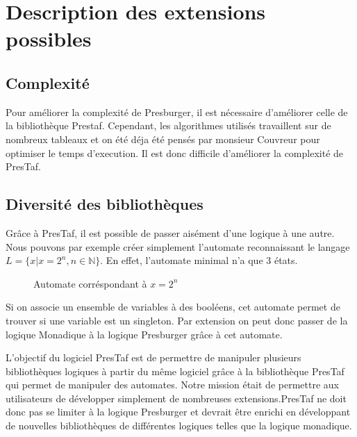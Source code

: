 \section{Description des extensions possibles}

\subsection{Complexité}

Pour améliorer la complexité de Presburger, il est nécessaire d'améliorer celle de la bibliothèque Prestaf. Cependant, les algorithmes utilisés travaillent sur de nombreux tableaux et on été déja été pensés par monsieur Couvreur pour optimiser le temps d'execution. Il est donc difficile d'améliorer la complexité de PresTaf.

\subsection{Diversité des bibliothèques}

Grâce à PresTaf, il est possible de passer aisément d'une logique à une autre. Nous pouvons par exemple créer simplement l'automate reconnaissant le langage $L = \{x | x = 2^n, n \in \mathbb{N} \}$. En effet, l'automate minimal n'a que 3 états.

\begin{figure}[h]

\centering

\caption{Automate corréspondant à $x = 2^n$}
\end{figure}

Si on associe un ensemble de variables à des booléens, cet automate permet de trouver si une variable est un singleton. Par extension on peut donc passer de la logique Monadique à la logique Presburger grâce à cet automate.\\\par

L'objectif du logiciel PresTaf est de permettre de manipuler plusieurs bibliothèques logiques à partir du même logiciel grâce à la bibliothèque PresTaf qui permet de manipuler des automates. Notre mission était de permettre aux utilisateurs de développer simplement de nombreuses extensions.PresTaf ne doit donc pas se limiter à la logique Presburger et devrait être enrichi en développant de nouvelles bibliothèques de différentes logiques telles que la logique monadique. 
